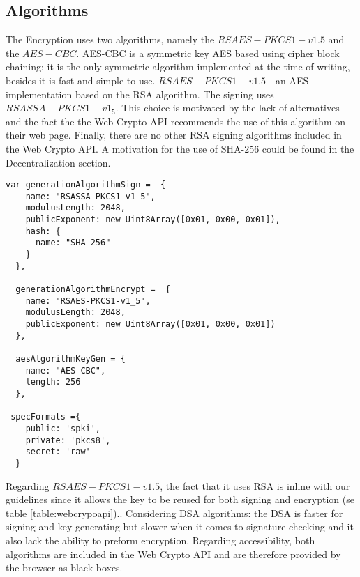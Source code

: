 \subsection{Algorithms}
The Encryption uses two algorithms, namely the $RSAES-PKCS1-v1.5$ and the $AES-CBC$.
AES-CBC is a symmetric key AES based using cipher block chaining; it is the only symmetric algorithm implemented at the time of writing, besides it is fast\cite{AESISFAST:Online} and simple to use.
$RSAES-PKCS1-v1.5$ - an AES implementation based on the RSA algorithm.
The signing uses $RSASSA-PKCS1-v1_5$. This choice is motivated by the lack of alternatives and the fact the the Web Crypto API recommends the use of this algorithm on their web page. Finally, there are no other RSA signing algorithms included in the Web Crypto API.
A motivation for the use of SHA-256 could be found in the Decentralization section.
\begin{Code}
\begin{lstlisting}[caption={Algorithms implemented}, label={lst:api}]
  var generationAlgorithmSign =  {
    name: "RSASSA-PKCS1-v1_5",
    modulusLength: 2048,
    publicExponent: new Uint8Array([0x01, 0x00, 0x01]),
    hash: {
      name: "SHA-256"
    }
  },

  generationAlgorithmEncrypt =  {
    name: "RSAES-PKCS1-v1_5",
    modulusLength: 2048,
    publicExponent: new Uint8Array([0x01, 0x00, 0x01])
  },

  aesAlgorithmKeyGen = {
    name: "AES-CBC",
    length: 256
  },

 specFormats ={
    public: 'spki',
    private: 'pkcs8',
    secret: 'raw'
  }
\end{lstlisting}
\end{Code}
Regarding $RSAES-PKCS1-v1.5$, the fact that it uses RSA is inline with our guidelines since it allows the key to be reused for both signing and encryption (se table \ref{table:webcrypoapi})..
Considering DSA algorithms: the DSA is faster for signing and key generating but slower when it comes to signature checking and it also lack the ability to preform encryption.
Regarding accessibility, both algorithms are included in the Web Crypto API and are therefore provided by the browser as black boxes.
